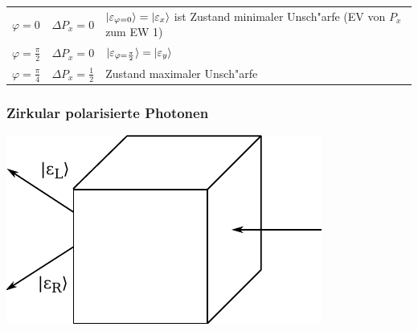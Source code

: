 \documentclass[a4paper]{scrartcl}
\begin{document}
{\begin{tabular}{l l p{300pt}}
$\varphi=0$ &  $\Delta P_x = 0$ &  $\ket { \varepsilon_{\varphi = 0}} = \ket { \varepsilon_x }$ ist Zustand minimaler Unsch"arfe (EV von $P_x$ zum EW 1) \\
$\varphi = \frac \pi 2$ & $\Delta P_x = 0$ & $\ket {\varepsilon_{\varphi = \frac \pi 2}} = \ket{ \varepsilon_y}$ \\
$\varphi = \frac \pi 4$ & $\Delta P_x = \frac12$ & Zustand maximaler Unsch"arfe
\end{tabular}

\subsubsection*{Zirkular polarisierte Photonen}

\begin{center}
\includegraphics{038ZirkularPolPhotonen}\end{center}

}
\end{document}
